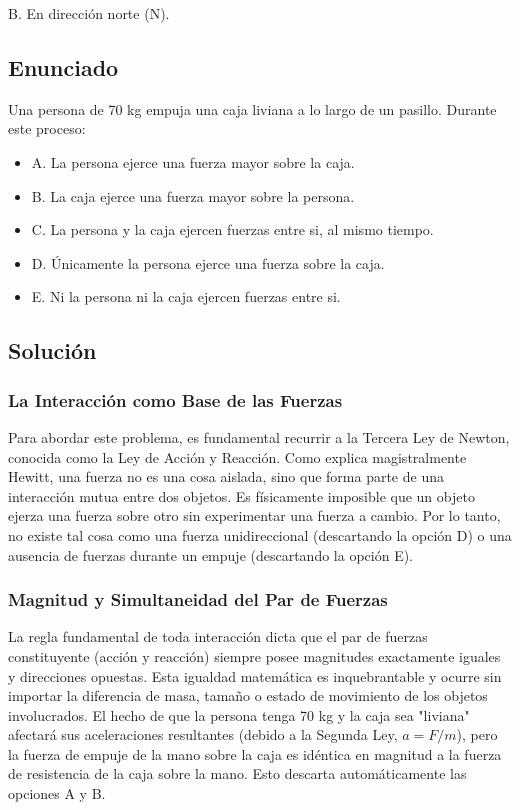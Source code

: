 \documentclass[12pt, a4paper]{article}
\begin{document}
B. En dirección norte (N).

\newpage
\subsection*{Enunciado}
Una persona de 70 kg empuja una caja liviana a lo largo de un pasillo. Durante este proceso:

\begin{itemize}
    \item A. La persona ejerce una fuerza mayor sobre la caja.
    \item B. La caja ejerce una fuerza mayor sobre la persona.
    \item C. La persona y la caja ejercen fuerzas entre si, al mismo tiempo.
    \item D. Únicamente la persona ejerce una fuerza sobre la caja.
    \item E. Ni la persona ni la caja ejercen fuerzas entre si.
\end{itemize}

\subsection*{Solución}

\subsubsection*{La Interacción como Base de las Fuerzas}

Para abordar este problema, es fundamental recurrir a la Tercera Ley de Newton, conocida como la Ley de Acción y Reacción. Como explica magistralmente Hewitt, una fuerza no es una cosa aislada, sino que forma parte de una interacción mutua entre dos objetos. Es físicamente imposible que un objeto ejerza una fuerza sobre otro sin experimentar una fuerza a cambio. Por lo tanto, no existe tal cosa como una fuerza unidireccional (descartando la opción D) o una ausencia de fuerzas durante un empuje (descartando la opción E).

\subsubsection*{Magnitud y Simultaneidad del Par de Fuerzas}

La regla fundamental de toda interacción dicta que el par de fuerzas constituyente (acción y reacción) siempre posee magnitudes exactamente iguales y direcciones opuestas. Esta igualdad matemática es inquebrantable y ocurre sin importar la diferencia de masa, tamaño o estado de movimiento de los objetos involucrados. El hecho de que la persona tenga 70 kg y la caja sea "liviana" afectará sus aceleraciones resultantes (debido a la Segunda Ley, $a = F/m$), pero la fuerza de empuje de la mano sobre la caja es idéntica en magnitud a la fuerza de resistencia de la caja sobre la mano. Esto descarta automáticamente las opciones A y B.
\end{document}
